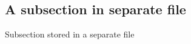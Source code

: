 \subsection{A subsection in separate file}
\label{sec:sub1}
\begin{info}
	Subsection stored in a separate file
\end{info}



